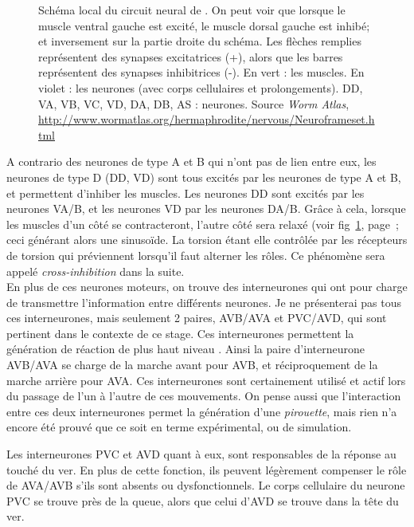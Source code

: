 \begin{figure}[ht]
   \begin{center}
   \end{center}
   \caption[Schéma local du circuit neural de \celeg{}]{Schéma local du circuit neural de \celeg{}. On peut voir
   que lorsque le muscle ventral gauche est excité, le muscle dorsal gauche est
   inhibé; et inversement sur la partie droite du schéma. Les flèches remplies
   représentent des synapses excitatrices (+), alors que les barres représentent des
   synapses inhibitrices (-). En vert : les muscles. En violet : les neurones (avec corps cellulaires et prolongements).
   DD, VA, VB, VC, VD, DA, DB, AS : neurones. Source \textit{Worm Atlas}\cite{AltunZ.F.andHall2011},
   \url{http://www.wormatlas.org/hermaphrodite/nervous/Neuroframeset.html}}
   \label{fig:alternance_dv}
\end{figure}

A contrario des neurones de type A et B qui n'ont pas de lien entre eux, les
neurones de type D (DD, VD) sont tous excités par les neurones de type A et B,
et permettent d'inhiber les muscles. Les neurones DD sont excités par les
neurones VA/B, et les neurones VD par les neurones DA/B. Grâce à cela, lorsque
les muscles d'un côté se contracteront, l'autre côté sera relaxé (voir
fig~\ref{fig:alternance_dv}, page~\pageref{fig:alternance_dv}; ceci générant
alors une sinusoïde. La torsion étant elle contrôlée par les récepteurs de
torsion qui préviennent lorsqu'il faut alterner les rôles. Ce phénomène sera
appelé \textit{cross-inhibition} dans la suite.\\


En plus de ces neurones moteurs, on trouve des interneurones qui ont pour
charge de transmettre l'information entre différents neurones. Je ne
présenterai pas tous ces interneurones, mais seulement 2 paires, AVB/AVA et
PVC/AVD, qui sont pertinent dans le contexte de ce stage. Ces interneurones
permettent la génération de réaction de plus haut niveau
\cite{Boyle2009,White1986}.  Ainsi la paire d'interneurone AVB/AVA se charge de
la marche avant pour AVB, et réciproquement de la marche arrière pour AVA. Ces
interneurones sont certainement utilisé et actif lors du passage de l'un à
l'autre de ces mouvements. On pense aussi que l'interaction entre ces deux
interneurones permet la génération d'une \textit{pirouette}, mais rien n'a
encore été prouvé que ce soit en terme expérimental, ou de simulation.

Les interneurones PVC et AVD quant à eux, sont responsables de la réponse au
touché du ver. En plus de cette fonction, ils peuvent légèrement compenser le
rôle de AVA/AVB s'ils sont absents ou dysfonctionnels. Le corps cellulaire du
neurone PVC se trouve près de la queue, alors que celui d'AVD se trouve dans la
tête du ver.


